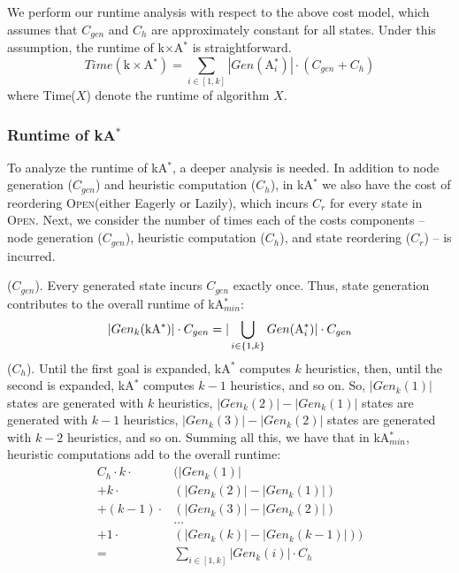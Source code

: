 \documentclass{aicom2e}
\newcommand{\kastar}{kA$^*$}
\newcommand{\kastarmin}{kA$^*_{min}$}
\newcommand{\kxastar}{k$\times$A$^*$}
\newcommand{\astari}[1]{A$^*_#1$}
\newcommand{\open}{\textsc{Open}}
\begin{document}

We perform our runtime analysis with respect to the above cost model,
which assumes that $C_{gen}$ and $C_h$ are approximately constant
for all states. Under this assumption, the runtime of \kxastar{} is straightforward.
\[
Time(\text{\kxastar{}}) = \sum_{i\in[1,k]} |Gen(\text{\astari{i}})|\cdot (C_{gen}+C_h)
\]
where Time($X$) denote the runtime of algorithm $X$.

\subsubsection{Runtime of \kastar{}}

To analyze the runtime of \kastar{}, a deeper analysis is needed. In addition to node generation ($C_{gen}$) and heuristic computation ($C_h$), in \kastar{} we also have the cost of reordering \open (either Eagerly or Lazily), which incurs $C_r$ for every state in \open{}.
Next, we consider the number of
times each of the costs components -- node generation ($C_{gen}$), heuristic computation ($C_h$), and state reordering ($C_r$) -- is incurred.

 ($C_{gen}$). Every generated state incurs
$C_{gen}$ exactly once. Thus, state generation contributes to the overall runtime of \kastarmin{}:
\[
|Gen_k(\text{\kastar{}})|\cdot C_{gen} =
|\bigcup_{i\in{\{1,k\}}} Gen(\text{\astari{i}})|\cdot C_{gen}
  \displaystyle
\]
 ($C_{h}$).
Until the first goal is expanded, \kastar{} computes $k$ heuristics,
then, until the second is expanded, \kastar{} computes $k-1$ heuristics, and so on.
So, $|Gen_k(1)|$ states are generated with $k$ heuristics,
$|Gen_{k}(2)|-|Gen_{k}(1)|$ states are generated with $k-1$ heuristics,
$|Gen_{k}(3)|-|Gen_{k}(2)|$ states are generated with $k-2$ heuristics,
and so on.
Summing all this, we have that in \kastarmin{}, heuristic computations add to the overall runtime:
\begin{align*}
    C_h\cdot k \cdot & (|Gen_k(1)| \\
     + k \cdot&(|Gen_k(2)|-|Gen_k(1)|)\\
     + (k-1) \cdot&(|Gen_k(3)|-|Gen_k(2)|) \\
     &\ldots\\
     + 1 \cdot&(|Gen_k(k)|-|Gen_k(k-1)|))\\
     =&\sum_{i\in[1,k]} |Gen_k(i)|\cdot C_h
\end{align*}
\end{document}
